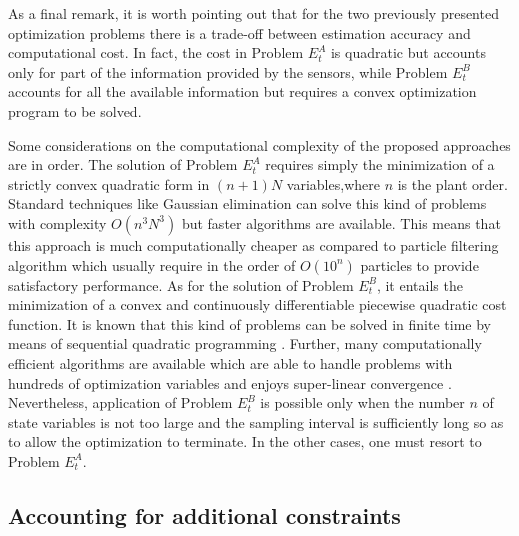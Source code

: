 \documentclass[11pt,journal,onecolumn]{IEEEtran}
\begin{document}
As a final remark, it is worth pointing out that for the two previously presented optimization problems there is a trade-off between estimation accuracy and computational cost. In fact, the cost in Problem $E_{t}^{A}$ is quadratic but accounts only for part of the information provided by the sensors, while Problem $E_{t}^{B}$ accounts for all the available information but requires a convex optimization program to be solved.

Some considerations on the computational complexity of the proposed approaches are in order. The solution of Problem  $E_{t}^{A}$ requires simply the minimization of a strictly convex quadratic form in $(n+1) N$ variables,where $n$ is the plant order. Standard techniques like Gaussian elimination can solve this kind of problems with complexity $O(n^3 N^3)$ but faster algorithms are available. This means that this approach is much computationally cheaper as compared to particle filtering algorithm which usually require in the order of $O(10^n)$ particles to provide satisfactory performance. As for the solution of Problem $E_{t}^{B}$, it entails the minimization of a convex and continuously differentiable piecewise quadratic cost function. It is known that this kind of problems can be solved in finite time by means of sequential quadratic programming \cite{PWCP}. Further, many computationally efficient algorithms are available which are able to handle problems with hundreds of optimization variables \cite{OPT1,OPT2} and enjoys super-linear convergence \cite{bounds}. Nevertheless, application of Problem $E_{t}^{B}$ is possible only when the number $n$ of state variables is not too large and the sampling interval is sufficiently long so as to allow the optimization to terminate. In the other cases, one must resort to Problem $E_{t}^{A}$.

\subsection{Accounting for additional constraints}
\end{document}
